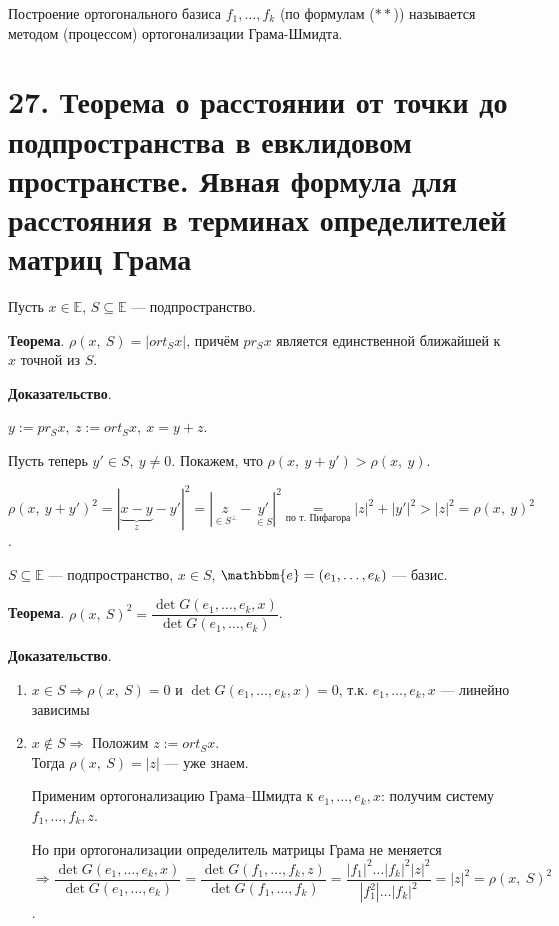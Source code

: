 \documentclass[a4paper, 12pt]{article}
\newcommand{\E}{\mathbb{E}}
\newcommand{\me}{\mathbbm{e}}
\begin{document}
Построение ортогонального базиса $f_1, \ldots, f_k$ (по формулам ($**$)) называется методом (процессом) ортогонализации Грама-Шмидта.

\section*{27. Теорема о расстоянии от точки до подпространства в евклидовом пространстве. Явная формула для расстояния в терминах определителей матриц Грама}
Пусть $x \in \E$, $S \subseteq \E$ --- подпространство.

\textbf{Теорема}. $\rho (x,\ S) = |ort_Sx|$, причём $pr_Sx$ является единственной ближайшей к $x$ точной из $S$.

\textbf{Доказательство}.

$y := pr_Sx,\ z := ort_Sx,\ x = y + z$.

Пусть теперь $y' \in S,\ y \neq 0$. Покажем, что $\rho(x,\ y + y') > \rho(x,\ y)$.

$\rho(x,\ y + y')^2 = |\underbrace{x - y}_{z} - y'|^2 = |\underset{\in S^\bot}{z} - \underset{\in S}{y'}|^2 \underset{\text{по т. Пифагора}}{=} |z|^2 + |y'|^2 > |z|^2 = \rho(x,\ y)^2$.

\vspace{5mm}
$S \subseteq \E$ --- подпространство, $x \in S$, $\me = (e_1, \ldots, e_k)$ --- базис.

\textbf{Теорема}. $\rho(x,\ S)^2 = \dfrac{\det G(e_1, \ldots, e_k, x)}{\det G(e_1, \ldots, e_k)}$.

\textbf{Доказательство}.
\vspace{-3mm}
\begin{enumerate}[(1)]
\itemsep=0em
\item $x \in S \Longrightarrow \rho(x,\ S) = 0$ и $\det G(e_1, \ldots, e_k, x) = 0$, т.к. $e_1, \ldots, e_k, x$ --- линейно зависимы
\item $x \not \in S \Longrightarrow$ Положим $z := ort_Sx$. \\
Тогда $\rho(x,\ S) = |z|$ --- уже знаем.

Применим ортогонализацию Грама--Шмидта к $e_1, \ldots, e_k, x$: получим систему $f_1, \ldots, f_k, z$.

Но при ортогонализации определитель матрицы Грама не меняется $\Longrightarrow \dfrac{\det G(e_1, \ldots, e_k, x)}{\det G(e_1, \ldots, e_k)} = \dfrac{\det G(f_1, \ldots, f_k, z)}{\det G(f_1, \ldots, f_k)} = \dfrac{|f_1|^2 \ldots |f_k|^2 |z|^2}{|f_1^2| \ldots |f_k|^2} = |z|^2 = \rho(x,\ S)^2$.
\end{enumerate}
\end{document}

